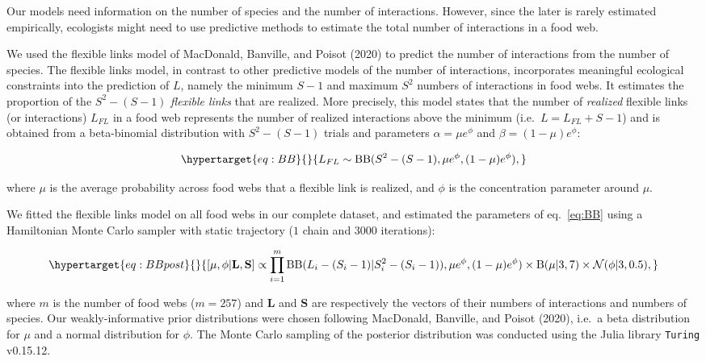 \documentclass[10pt,oneside]{article}
\begin{document}
Our models need information on the number of species and the number of
interactions. However, since the later is rarely estimated empirically,
ecologists might need to use predictive methods to estimate the total
number of interactions in a food web.

We used the flexible links model of MacDonald, Banville, and Poisot
(2020) to predict the number of interactions from the number of species.
The flexible links model, in contrast to other predictive models of the
number of interactions, incorporates meaningful ecological constraints
into the prediction of \(L\), namely the minimum \(S-1\) and maximum
\(S^2\) numbers of interactions in food webs. It estimates the
proportion of the \(S^2 - (S - 1)\) \emph{flexible links} that are
realized. More precisely, this model states that the number of
\emph{realized} flexible links (or interactions) \(L_{FL}\) in a food
web represents the number of realized interactions above the minimum
(i.e.~\(L = L_{FL} + S - 1\)) and is obtained from a beta-binomial
distribution with \(S^2 - (S - 1)\) trials and parameters
\(\alpha = \mu e^\phi\) and \(\beta = (1 - \mu) e^\phi\):

\begin{equation}\protect\hypertarget{eq:BB}{}{L_{FL} \sim \mathrm{BB}(S^2 - (S - 1), \mu e^\phi, (1 - \mu) e^\phi),}\label{eq:BB}\end{equation}

where \(\mu\) is the average probability across food webs that a
flexible link is realized, and \(\phi\) is the concentration parameter
around \(\mu\).

We fitted the flexible links model on all food webs in our complete
dataset, and estimated the parameters of eq.~\ref{eq:BB} using a
Hamiltonian Monte Carlo sampler with static trajectory (\(1\) chain and
\(3000\) iterations):

\begin{equation}\protect\hypertarget{eq:BBpost}{}{ [\mu, \phi| \textbf{L}, \textbf{S}] \propto \prod_{i = 1}^{m} \mathrm{BB}(L_i - (S_i - 1) | S_i^2 - (S_i - 1)), \mu e^{\phi}, (1 - \mu) e^\phi) \times \mathrm{B}(\mu| 3 , 7 ) \times \mathcal{N}(\phi | 3, 0.5), }\label{eq:BBpost}\end{equation}

where \(m\) is the number of food webs (\(m = 257\)) and \(\textbf{L}\)
and \(\textbf{S}\) are respectively the vectors of their numbers of
interactions and numbers of species. Our weakly-informative prior
distributions were chosen following MacDonald, Banville, and Poisot
(2020), i.e.~a beta distribution for \(\mu\) and a normal distribution
for \(\phi\). The Monte Carlo sampling of the posterior distribution was
conducted using the Julia library \texttt{Turing} v0.15.12.
\end{document}
